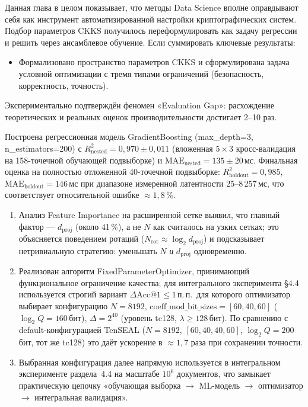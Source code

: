 \documentclass[a4paper, 12pt, oneside, openany]{article}
\begin{document}
Данная глава в целом показывает, что методы Data Science вполне оправдывают себя как инструмент автоматизированной настройки криптографических систем. Подбор параметров CKKS получилось переформулировать как задачу регрессии и решить через ансамблевое обучение. Если суммировать ключевые результаты:
\begin{itemize}
	\item
	Формализовано пространство параметров CKKS и сформулирована задача условной оптимизации с тремя типами ограничений (безопасность, корректность, точность).
\end{itemize}

Экспериментально подтверждён феномен «Evaluation Gap»: расхождение теоретических и реальных оценок производительности достигает 2--10 раз.

Построена регрессионная модель GradientBoosting (max\_depth=3, n\_estimators=200) с $R^{2}_{\text{nested}} = 0{,}970 \pm 0{,}011$ (вложенная 5\,$\times$\,3 кросс-валидация на 158-точечной обучающей подвыборке) и $\mathrm{MAE}_{\text{nested}} = 135 \pm 20$\,мс. Финальная оценка на полностью отложенной 40-точечной подвыборке: $R^{2}_{\text{holdout}} = 0{,}985$, $\mathrm{MAE}_{\text{holdout}} = 146$\,мс при диапазоне измеренной латентности 25--8\,257\,мс, что соответствует относительной ошибке $\approx 1{,}8\,\%$.

\begin{enumerate}
	
	\item Анализ Feature Importance на расширенной сетке выявил, что главный фактор --- $d_{\text{proj}}$ (около 41\,\%), а не $N$ как считалось на узких сетках; это объясняется поведением ротаций ($N_{\text{rot}} \approx \log_2 d_{\text{proj}}$) и подсказывает нетривиальную стратегию: уменьшать $N$ \emph{и} $d_{\text{proj}}$ одновременно.

	\item Реализован алгоритм FixedParameterOptimizer, принимающий функциональное ограничение качества; для интегрального эксперимента §4.4 используется строгий вариант $\Delta\mathrm{Acc@1} \leq 1$\,п.\,п.\, для которого оптимизатор выбирает конфигурацию $N = 8192$, $\text{coeff\_mod\_bit\_sizes} = [60, 40, 60]$ ($\log_{2} Q = 160$\,бит), $\Delta = 2^{40}$ (уровень tc128, $\lambda \geq 128$\,бит). По сравнению с default-конфигурацией TenSEAL ($N = 8192$, $[60, 40, 40, 60]$, $\log_{2} Q = 200$ бит, тот же tc128) это даёт ускорение в $\approx 1{,}7$ раза при сохранении точности.

	\item Выбранная конфигурация далее напрямую используется в интегральном эксперименте раздела~4.4 на масштабе $10^{6}$ документов, что замыкает практическую цепочку «обучающая выборка $\to$ ML-модель $\to$ оптимизатор $\to$ интегральная валидация».
	
\end{enumerate}
\end{document}
